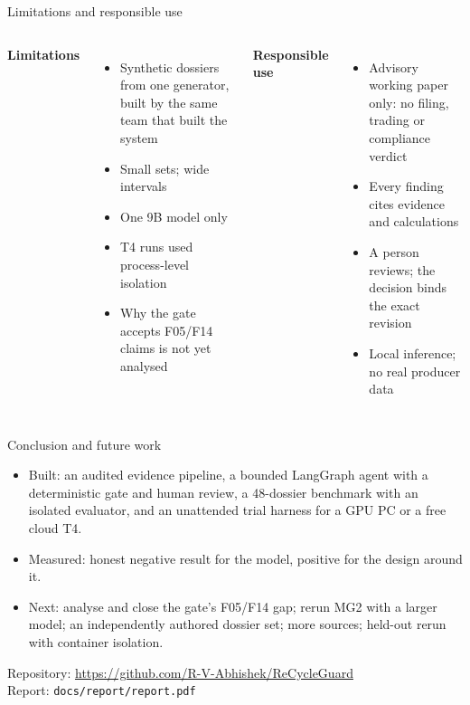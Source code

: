\documentclass[aspectratio=169,11pt,t]{beamer}
\begin{document}
\begin{frame}{Limitations and responsible use}
\begin{columns}[T]
\textbf{Limitations}
\begin{itemize}\small
\item Synthetic dossiers from one generator, built by the same team that built the system
\item Small sets; wide intervals
\item One 9B model only
\item T4 runs used process-level isolation
\item Why the gate accepts F05/F14 claims is not yet analysed
\end{itemize}
\textbf{Responsible use}
\begin{itemize}\small
\item Advisory working paper only: no filing, trading or compliance verdict
\item Every finding cites evidence and calculations
\item A person reviews; the decision binds the exact revision
\item Local inference; no real producer data
\end{itemize}
\end{columns}
\end{frame}

\begin{frame}{Conclusion and future work}
\begin{itemize}
\item Built: an audited evidence pipeline, a bounded LangGraph agent with a deterministic gate and
human review, a 48-dossier benchmark with an isolated evaluator, and an unattended trial harness
for a GPU PC or a free cloud T4.
\item Measured: honest negative result for the model, positive for the design around it.
\item Next: analyse and close the gate's F05/F14 gap; rerun MG2 with a larger model; an
independently authored dossier set; more sources; held-out rerun with container isolation.
\end{itemize}
\vspace{0.8em}
\centering\small
Repository: \url{https://github.com/R-V-Abhishek/ReCycleGuard}\\[0.3em]
Report: \texttt{docs/report/report.pdf}
\end{frame}
\end{document}
